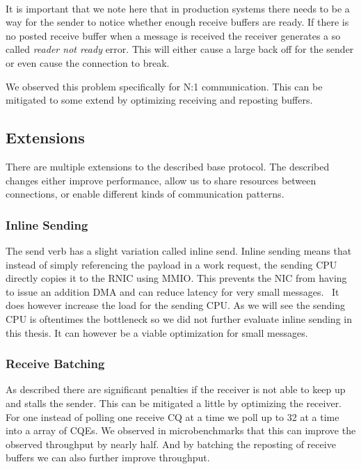 \paragraph{} It is important that we note here that in production systems there needs to be a way for the sender to notice whether 
enough receive buffers are ready. If there is no posted receive buffer when a message is received the receiver  generates
a so called \emph{reader not ready} error. This will either cause a large back off for the sender or even cause the connection
to break.

We observed this problem specifically for N:1 communication. This can be mitigated to some extend by optimizing receiving and
reposting buffers.




\subsection{Extensions}

There are multiple extensions to the described base protocol. The described changes either improve performance, allow us to
share resources between connections, or enable different kinds of communication patterns.

\subsubsection{Inline Sending}
The send verb has a slight variation called inline send. Inline sending means that instead of 
simply referencing the payload in a work request, the sending CPU directly copies it to the RNIC using MMIO. This prevents
the NIC from having to issue an addition DMA and can reduce latency for very small messages.~\cite{anuj-guide} It does however
increase the load for the sending CPU. As we will see the sending CPU is oftentimes the bottleneck so we did not further 
evaluate inline sending in this thesis. It can however be a viable optimization for small messages.


\subsubsection{Receive Batching} 
As described there are significant penalties if the receiver is not able to keep up and stalls the sender.
This can be mitigated a little by optimizing the receiver. For one instead of polling one receive CQ at a time we poll up to 32
at a time into a array of CQEs. We observed in microbenchmarks that this can improve the observed throughput by nearly half.
And by batching the reposting of receive buffers we can also further improve throughput.

